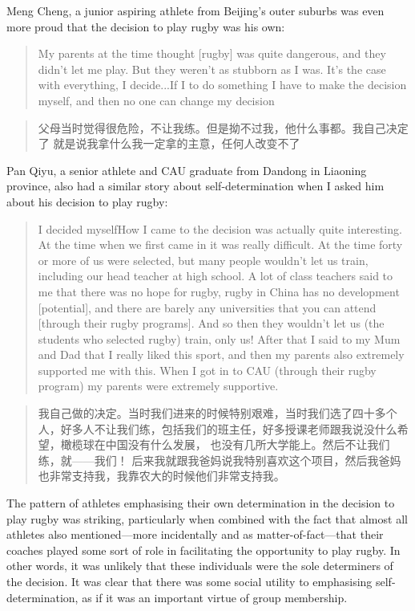 \begin{CJK}{UTF8}{gbsn}
Meng Cheng, a junior aspiring athlete from Beijing's outer suburbs was even more proud that the decision to play rugby was his own:
       \begin{quote}
         My parents at the time thought [rugby] was quite dangerous, and they didn't let me play.  But they weren't as stubborn as I was.  It's the case with everything, I decide...If I to do something I have to make the decision myself, and then no one can change my decision\textellipsis
       \end{quote}
       \begin{quote}
         父母当时觉得很危险，不让我练。但是拗不过我，他什么事都。我自己决定了\textellipsis
         就是说我拿什么我一定拿的主意，任何人改变不了\textellipsis
       \end{quote}
Pan Qiyu, a senior athlete and CAU graduate from Dandong in Liaoning province, also had a similar story about self-determination when I asked him about his decision to play rugby:
     \begin{quote}
       I decided myself\textellipsis How I came to the decision was actually quite interesting.  At the time when we first came in it was really difficult.  At the time forty or more of us were selected, but many people wouldn't let us train, including our head teacher at high school.  A lot of class teachers said to me that there was no hope for rugby, rugby in China has no development [potential], and there are barely any universities that you can attend [through their rugby programs].  And so then they wouldn't let us (the students who selected rugby) train, only us! After that I said to my Mum and Dad that I really liked this sport, and then my parents also extremely supported me with this.  When I got in to CAU (through their rugby program) my parents were extremely supportive.
    \end{quote}

     \begin{quote}
       我自己做的决定。当时我们进来的时候特别艰难，当时我们选了四十多个人，好多人不让我们练，包括我们的班主任，好多授课老师跟我说没什么希望，橄榄球在中国没有什么发展， 也没有几所大学能上。然后不让我们练，就——我们！ 后来我就跟我爸妈说我特别喜欢这个项目，然后我爸妈也非常支持我，我靠农大的时候他们非常支持我。
     \end{quote}

The pattern of athletes emphasising their own determination in the decision to play rugby was striking, particularly when combined with the fact that almost all athletes also mentioned---more incidentally and as matter-of-fact---that their coaches played some sort of role in facilitating the opportunity to play rugby.  In other words, it was unlikely that these individuals were the sole determiners of the decision.  It was clear that there was some social utility to emphasising self-determination, as if it was an important virtue of group membership.


\end{CJK}
